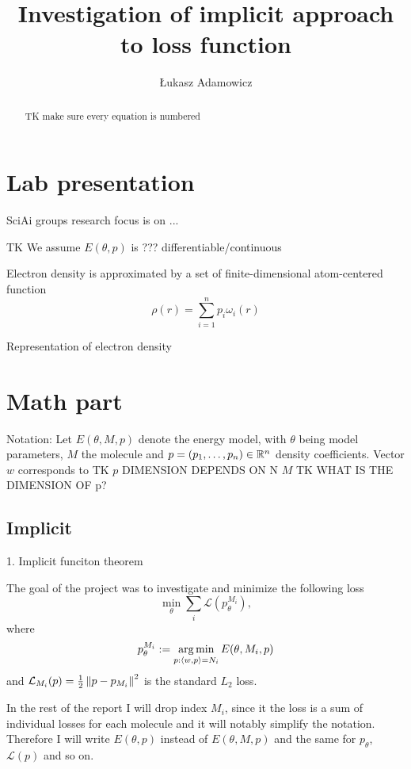 \documentclass[a4paper,10pt]{report}
\title{Investigation of implicit approach to loss function}
\author{Łukasz Adamowicz}
\begin{document}
\maketitle

\begin{abstract}
TK make sure every equation is numbered
\end{abstract}



\section{ Lab presentation}
SciAi groups research focus is on ...

TK
We assume $E(\theta, p)$ is ??? differentiable/continuous

Electron density is approximated by a set of finite-dimensional  atom-centered function
\begin{equation}
 \rho(r) = \sum_{i=1}^n p_i \omega_i(r)
\end{equation}


Representation of electron density
 \section{Math part}
Notation: Let $E(\theta, M ,p)$ denote the energy model, with $\theta$ being model parameters, $M$ the molecule and $p=(p_1, \ldots ,p_n )\in \mathbb{R}^n$ density coefficients. Vector $w$ corresponds to
TK $p$ DIMENSION DEPENDS ON N $M$
TK WHAT IS THE DIMENSION OF p?

 \subsection{Implicit}
1. Implicit funciton theorem

The goal of the project was to investigate and minimize the following loss
\begin{equation}
 \min_\theta \sum_i \mathcal{L}(p_{\theta}^{M_i}),
\end{equation}
where
\begin{equation}
  p_\theta^{M_i}:=\operatorname*{arg\,min}_{p : \langle w, p \rangle=N_i} E(\theta,M_i,p)
\end{equation}
and $\mathcal{L}_{M_i}(p) = \frac{1}{2}\left\|p-p_{M_i}\right\|^2$ is the standard $L_2$ loss.

In the rest of the report I will drop index $M_i$, since it the loss is a sum of individual losses for each molecule and it will notably simplify the notation.
Therefore I will write $E(\theta,p)$ instead of $E(\theta,M,p)$ and the same for $p_\theta$, $\mathcal{L}(p)$ and so on.
\end{document}

